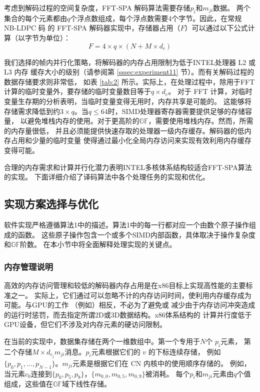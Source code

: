 \documentclass{cjc}
\begin{document}
  考虑到解码过程的空间复杂度，FFT-SPA 解码算法需要存储$p_i$和$m_{ji}$数据。
  两个集合的每个元素都由$q$个浮点数组成，每个浮点数需要4个字节。因此，在常规 NB-LDPC 码
  的 FFT-SPA 解码器实现中，存储器占用（$F$）可以通过以下公式计算（以字节为单位）：
  $$F=4\times{q}\times(N+M\times{d_c})$$

  我们选择的帧内并行化策略，将解码器的内存占用限制为低于INTEL处理器 L2 或 L3 内存
  缓存大小的级别（请参阅第 \ref{sssec:experiment11} 节）。而有关解码过程的数据存储要求则非常低，
  如表 \ref{tab:2} 所示。实际上，在处理过程中，除用于FFT计算的临时变量外，要存储的临时变量数目等于$q\times{d_c}$。
  对于 FFT 计算，对临时变量生存期的分析表明，当临时变量变得无用时，内存共享是可能的。
  这能够将存储需求降低到约$3\times{q}$。当$q\leq64$时，SIMD处理器寄存器需要提供足够的存储容量，
  以避免堆栈内存的使用。对于更高阶的$\mathbb{GF}$，需要使用堆栈内存。然而，所需的内存量很低，
  并且必须能提供快速存取的处理器一级内存缓存。解码器的低内存占用和少量的临时变量
  使得通过最小化全局内存访问来实现有效利用内存缓存变得可能。

  合理的内存需求和计算并行化潜力表明INTEL多核体系结构较适合FFT-SPA算法的实现。
  下面详细介绍了译码算法中各个处理任务的实现和优化。

\subsection{实现方案选择与优化}

  软件实现严格遵循算法1中的描述。算法1中的每一行都对应一个由数个原子操作组成的函数。
  这些原子操作包含一个或多个SIMD内部函数，具体取决于操作复杂度和$\mathbb{GF}$阶数。
  在本小节中将全面解释处理实现的关键点。

\subsubsection{内存管理说明}

  高效的内存访问管理和较低的解码器内存占用是在x86目标上实现高性能的主要标准之一。
  实际上，它们通过可以忽略不计的内存访问时间，使利用内存缓存成为可能。与GPU的工作
  （例如\cite{noauthor_beermann_nodate,andrade_optimized_2014}）相反，不必为了避免或
  减少由于内存访问冲突造成的运行时惩罚，而去指定所谓2D或3D数据结构。x86体系结构的
  计算并行度低于GPU设备，但它们不涉及对内存元素的硬访问限制。

  在当前的实现中，数据集存储在两个一维数组中。第一个专用于$N$个 $p_i$元素，
  第二个存储$M\times{d_{c_j}}m_{ji}$消息。$p_i$元素根据它们的 $v$ 的下标连续存储，
  例如$\{p_0,p_1,\dots,p_{N−1}\}$。$m_{ji}$元素是根据它们在 CN 内核中的使用顺序存储的。
  例如，当元素$c_0$连接到$\{p_0,p_5,p_9\}$，$\{m_{0,0},m_{0,5},m_{0,9}\}$被消耗。
  每个$p_i$和$m_{ji}$元素由$q$个值组成，这些值在$\mathbb{GF}$域下线性存储。
\end{document}
